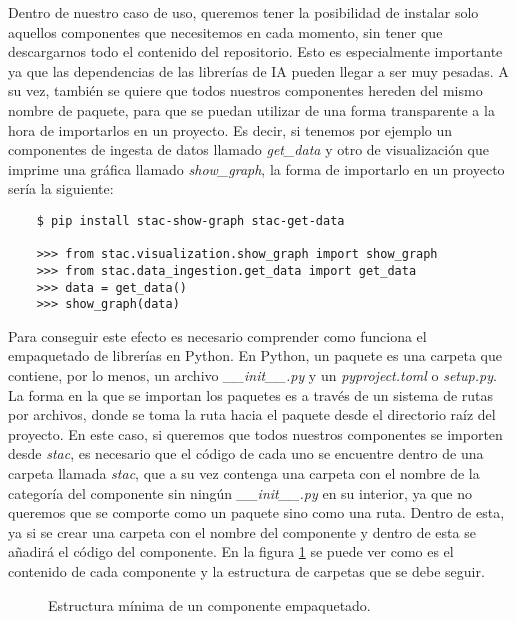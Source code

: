 Dentro de nuestro caso de uso, queremos tener la posibilidad de instalar
solo aquellos componentes que necesitemos en cada momento, sin tener que
descargarnos todo el contenido del repositorio. Esto es especialmente 
importante ya que las dependencias de las librerías de IA pueden llegar a
ser muy pesadas. A su vez, también se quiere que todos nuestros componentes
hereden del mismo nombre de paquete, para que se puedan utilizar de una forma
transparente a la hora de importarlos en un proyecto. Es decir, si tenemos por
ejemplo un componentes de ingesta de datos llamado \textit{get\_data} y otro de 
visualización que imprime una gráfica llamado \textit{show\_graph}, la forma de 
importarlo en un proyecto sería la siguiente:

\begin{verbatim}
    $ pip install stac-show-graph stac-get-data

    >>> from stac.visualization.show_graph import show_graph
    >>> from stac.data_ingestion.get_data import get_data
    >>> data = get_data()
    >>> show_graph(data)
\end{verbatim}

Para conseguir este efecto es necesario comprender como funciona el empaquetado
de librerías en Python. En Python, un paquete es una carpeta que contiene, por lo menos,
un archivo \textit{\_\_init\_\_.py} y un \textit{pyproject.toml} o \textit{setup.py}. 
La forma en la que se importan los paquetes es a través de un sistema de rutas por archivos, 
donde se toma la ruta hacia el paquete desde el directorio raíz del proyecto. En este caso,
si queremos que todos nuestros componentes se importen desde \textit{stac}, es necesario que
el código de cada uno se encuentre dentro de una carpeta llamada \textit{stac}, que a su vez
contenga una carpeta con el nombre de la categoría del componente sin ningún \textit{\_\_init\_\_.py} 
en su interior, ya que no queremos que se comporte como un paquete sino como una ruta.
Dentro de esta, ya si se crear una carpeta con el nombre del componente y dentro de esta
se añadirá el código del componente. En la figura \ref{fig:min-package} se puede ver 
como es el contenido de cada componente y la estructura de carpetas que se debe seguir.

\begin{figure}[ht]
    \caption{Estructura mínima de un componente empaquetado.}
    \label{fig:min-package}
\end{figure}

